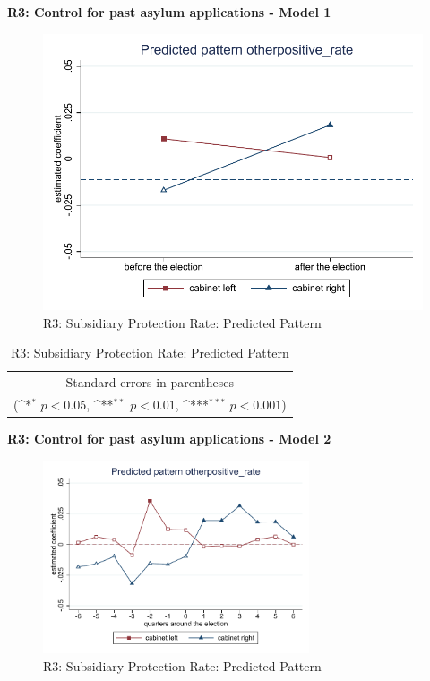 \documentclass[10pt,a4paper]{scrartcl}
\begin{document}
\clearpage
\textbf{R3: Control for past asylum applications - Model 1}
\begin{figure}[!ht]
	\centering
	\includegraphics[width=1\textwidth]{figures_edited/otherpositive_rate_graph1_R3.pdf}
	\caption{R3: Subsidiary Protection Rate: Predicted Pattern}
\end{figure}

\begin{table}[!ht]\centering
	\renewcommand{\arraystretch}{1.25}
	\def\sym#1{\ifmmode^{#1}\else\(^{#1}\)\fi}
	\caption{R3: Subsidiary Protection Rate: Predicted Pattern}
	\begin{tabular}{l*{2}{c}}
		\hline\hline
		
		\hline\hline
		\multicolumn{3}{c}{\footnotesize Standard errors in parentheses} \\
		\multicolumn{3}{c}{\footnotesize (\sym{*} \(p<0.05\), \sym{**} \(p<0.01\), \sym{***} \(p<0.001\))}\\
	\end{tabular}
\end{table}

\clearpage
\textbf{R3: Control for past asylum applications - Model 2}
\begin{figure}[!ht]
	\centering
	\includegraphics[width=0.7\textwidth]{figures_edited/otherpositive_rate_graph2_R3.pdf}
	\caption{R3: Subsidiary Protection Rate: Predicted Pattern}
\end{figure}
\end{document}
